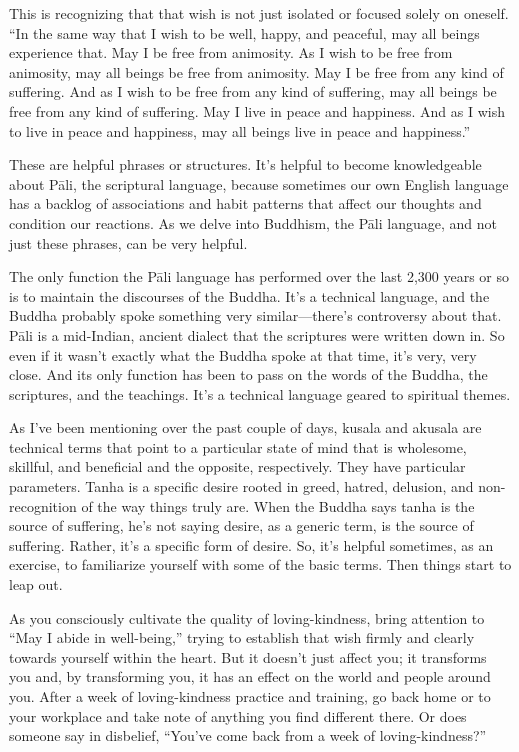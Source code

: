 This is recognizing that that wish is not just isolated or focused
solely on oneself. “In the same way that I wish to be well, happy, and
peaceful, may all beings experience that. May I be free from animosity.
As I wish to be free from animosity, may all beings be free from
animosity. May I be free from any kind of suffering. And as I wish to be
free from any kind of suffering, may all beings be free from any kind of
suffering. May I live in peace and happiness. And as I wish to live in
peace and happiness, may all beings live in peace and happiness.”

These are helpful phrases or structures. It’s helpful to become
knowledgeable about Pāli, the scriptural language, because sometimes our
own English language has a backlog of associations and habit patterns
that affect our thoughts and condition our reactions. As we delve into
Buddhism, the Pāli language, and not just these phrases, can be very
helpful.

The only function the Pāli language has performed over the last 2,300
years or so is to maintain the discourses of the Buddha. It’s a
technical language, and the Buddha probably spoke something very
similar—there’s controversy about that. Pāli is a mid-Indian, ancient
dialect that the scriptures were written down in. So even if it wasn’t
exactly what the Buddha spoke at that time, it’s very, very close. And
its only function has been to pass on the words of the Buddha, the
scriptures, and the teachings. It’s a technical language geared to
spiritual themes.

As I’ve been mentioning over the past couple of days, kusala and akusala
are technical terms that point to a particular state of mind that is
wholesome, skillful, and beneficial and the opposite, respectively. They
have particular parameters. Tanha is a specific desire rooted in greed,
hatred, delusion, and non-recognition of the way things truly are. When
the Buddha says tanha is the source of suffering, he’s not saying
desire, as a generic term, is the source of suffering. Rather, it’s a
specific form of desire. So, it’s helpful sometimes, as an exercise, to
familiarize yourself with some of the basic terms. Then things start to
leap out.

As you consciously cultivate the quality of loving-kindness, bring
attention to “May I abide in well-being,” trying to establish that wish
firmly and clearly towards yourself within the heart. But it doesn’t
just affect you; it transforms you and, by transforming you, it has an
effect on the world and people around you. After a week of
loving-kindness practice and training, go back home or to your workplace
and take note of anything you find different there. Or does someone say
in disbelief, “You’ve come back from a week of loving-kindness?”


